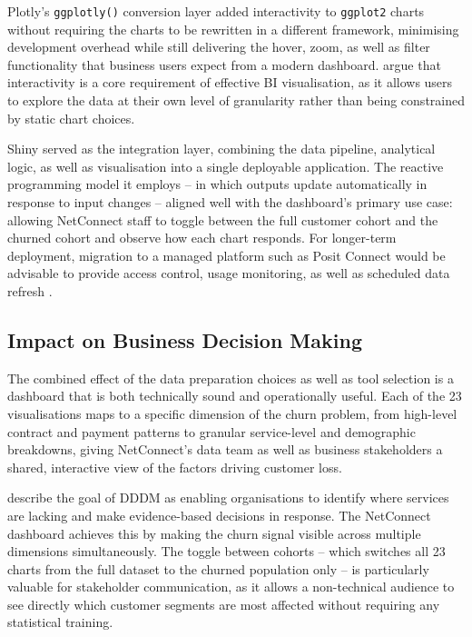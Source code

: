 \documentclass[12pt,a4paper]{article}
\begin{document}
Plotly's \texttt{ggplotly()} conversion layer added interactivity to \texttt{ggplot2} charts without requiring the charts to be rewritten in a different framework, minimising development overhead while still delivering the hover, zoom, as well as filter functionality that business users expect from a modern dashboard. \textcite{Lavalle2024} argue that interactivity is a core requirement of effective BI visualisation, as it allows users to explore the data at their own level of granularity rather than being constrained by static chart choices.

Shiny served as the integration layer, combining the data pipeline, analytical logic, as well as visualisation into a single deployable application. The reactive programming model it employs -- in which outputs update automatically in response to input changes -- aligned well with the dashboard's primary use case: allowing NetConnect staff to toggle between the full customer cohort and the churned cohort and observe how each chart responds. For longer-term deployment, migration to a managed platform such as Posit Connect would be advisable to provide access control, usage monitoring, as well as scheduled data refresh \parencite{Sabharwal2021}.

\subsection{Impact on Business Decision Making}

The combined effect of the data preparation choices as well as tool selection is a dashboard that is both technically sound and operationally useful. Each of the 23 visualisations maps to a specific dimension of the churn problem, from high-level contract and payment patterns to granular service-level and demographic breakdowns, giving NetConnect's data team as well as business stakeholders a shared, interactive view of the factors driving customer loss.

\textcite{Bhushan2024} describe the goal of DDDM as enabling organisations to identify where services are lacking and make evidence-based decisions in response. The NetConnect dashboard achieves this by making the churn signal visible across multiple dimensions simultaneously. The toggle between cohorts -- which switches all 23 charts from the full dataset to the churned population only -- is particularly valuable for stakeholder communication, as it allows a non-technical audience to see directly which customer segments are most affected without requiring any statistical training.
\end{document}
